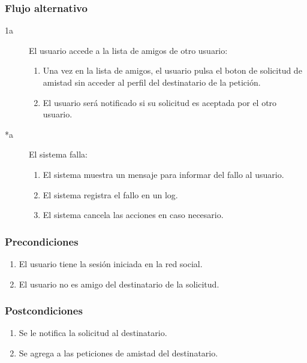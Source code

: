 \documentclass[12pt, a4paper, titlepage]{article}
\begin{document}
\subsubsection{Flujo alternativo}
\begin{description}
\item[1a] El usuario accede a la lista de amigos de otro usuario:
	\begin{enumerate}
		\item Una vez en la lista de amigos, el usuario pulsa el boton de solicitud de amistad sin acceder al perfil del destinatario de la petición.
		\item El usuario será notificado si su solicitud es aceptada por el otro usuario.
	\end{enumerate}
\end{description}

\begin{description}
	\item [*a] El sistema falla:
	\begin{enumerate}
		\item El sistema muestra un mensaje para informar del fallo al usuario.
		\item El sistema registra el fallo en un log.
		\item El sistema cancela las acciones en caso necesario.
	\end{enumerate}
\end{description}

\subsubsection{Precondiciones}
\begin{enumerate}
	\item El usuario tiene la sesión iniciada en la red social.
	\item El usuario no es amigo del destinatario de la solicitud.
\end{enumerate}
\subsubsection{Postcondiciones}
\begin{enumerate}
	\item Se le notifica la solicitud al destinatario.
	\item Se agrega a las peticiones de amistad del destinatario.
\end{enumerate}
\end{document}
